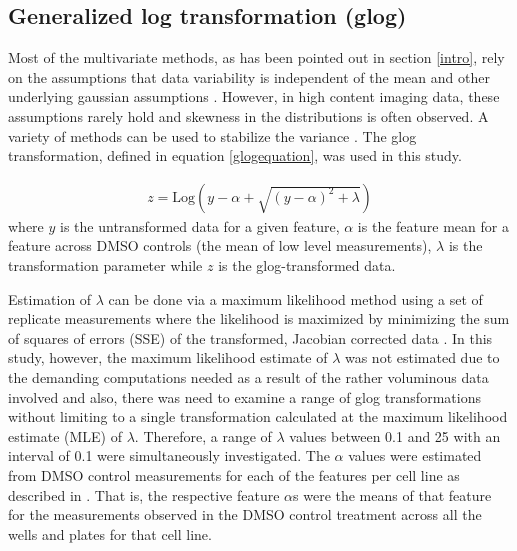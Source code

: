 \documentclass[11pt]{article}
\begin{document}
\subsection{Generalized log transformation (glog)}\label{glogtransformation}
\par{Most of the multivariate methods, as has been pointed out in section \ref{intro}, rely on the assumptions that data variability is independent of the mean and other underlying gaussian assumptions \cite{Rocke2001, Purohit2004, Johnson2006}. However, in high content imaging data, these assumptions rarely hold and skewness in the distributions is often  observed. A variety of methods can be used to stabilize the variance \cite{Huber2002, durbin2002variance, VandenBerg2006,yeo2000, Rocke2003}. The glog transformation, defined in equation \ref{glogequation}, was used in this study.

\begin{equation}\label{glogequation}
\begin{split}
z=\mbox{Log}(y-\alpha+\sqrt{(y-\alpha)^2+\lambda})
\end{split}
\end{equation}
where $y$ is the untransformed data for a given feature, $\alpha$ is the feature mean for a feature across DMSO controls (the mean of low level measurements), $\lambda$ is the transformation parameter while $z$ is the glog-transformed data.
}

\par{Estimation of $\lambda$ can be done via a maximum likelihood method using a set of replicate measurements where the likelihood is maximized by minimizing the sum of squares of errors (SSE) of the transformed, Jacobian corrected data \cite{Durbin2003, Purohit2004}. In this study, however, the maximum likelihood estimate of $\lambda$ was not estimated due to the demanding computations needed as a result of the rather voluminous data involved and also, there was need to examine a range of glog transformations without limiting to a single transformation calculated at the maximum likelihood estimate (MLE) of $\lambda$. Therefore, a range of $\lambda$ values between 0.1 and 25 with an interval of 0.1 were simultaneously investigated. The $\alpha$ values were estimated from DMSO control measurements for each of the features per cell line as described in \cite{Rocke2001}. That is, the respective feature $\alpha$s were the means of that feature for the measurements observed in the DMSO control treatment across all the wells and plates for that cell line. }
\end{document}
